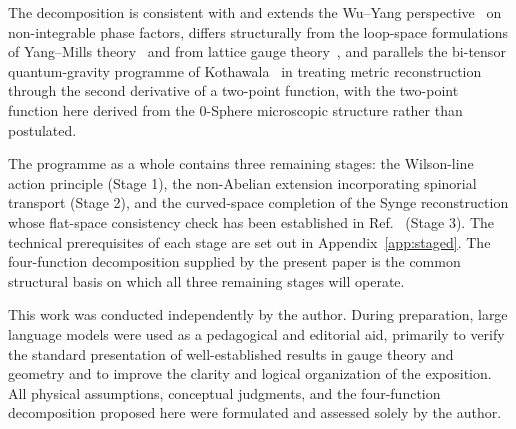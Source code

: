 \documentclass[%
 reprint, amsmath,amssymb, aps, prb, ]{revtex4-2}
\numberwithin{equation}{section}
\begin{document}
The decomposition is consistent with and extends the Wu--Yang perspective~\cite{WuYang1975} on non-integrable phase factors, differs structurally from the loop-space formulations of Yang--Mills theory~\cite{Mandelstam1968, Polyakov1979} and from lattice gauge theory~\cite{Wilson1974}, and parallels the bi-tensor quantum-gravity programme of Kothawala~\cite{Kothawala2023} in treating metric reconstruction through the second derivative of a two-point function, with the two-point function here derived from the 0-Sphere microscopic structure rather than postulated.

The programme as a whole contains three remaining stages: the Wilson-line action principle (Stage 1), the non-Abelian extension incorporating spinorial transport (Stage 2), and the curved-space completion of the Synge reconstruction whose flat-space consistency check has been established in Ref.~\cite{hanamura51} (Stage 3). The technical prerequisites of each stage are set out in Appendix~\ref{app:staged}. The four-function decomposition supplied by the present paper is the common structural basis on which all three remaining stages will operate.

\begin{acknowledgments}
This work was conducted independently by the author. During preparation, large language models were used as a pedagogical and editorial aid, primarily to verify the standard presentation of well-established results in gauge theory and geometry and to improve the clarity and logical organization of the exposition. All physical assumptions, conceptual judgments, and the four-function decomposition proposed here were formulated and assessed solely by the author.
\end{acknowledgments}

\end{document}
